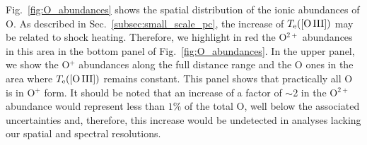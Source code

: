 \documentclass[twocolumn,linenumbers]{aastex63}
\begin{document}
Fig.~\ref{fig:O_abundances} shows the spatial distribution of the ionic abundances of O. As described in Sec.~\ref{subsec:small_scale_pc}, the increase of $T_{\rm e}(\text{[O\thinspace III]})$ may be related to shock heating. Therefore, we highlight in red the O$^{2+}$ abundances in this area in the bottom panel of Fig.~\ref{fig:O_abundances}. In the upper panel, we show the O$^+$ abundances along the full distance range and the O ones in the area where $T_{\rm e}(\text{[O\thinspace III]})$ remains constant. This panel shows that practically all O is in O$^{+}$ form. It should be noted that an increase of a factor of $\sim$2 in the O$^{2+}$ abundance would represent  less than $1\%$ of the total O, well below the associated uncertainties and, therefore, this increase would be undetected in analyses lacking our spatial and spectral resolutions.
\end{document}
